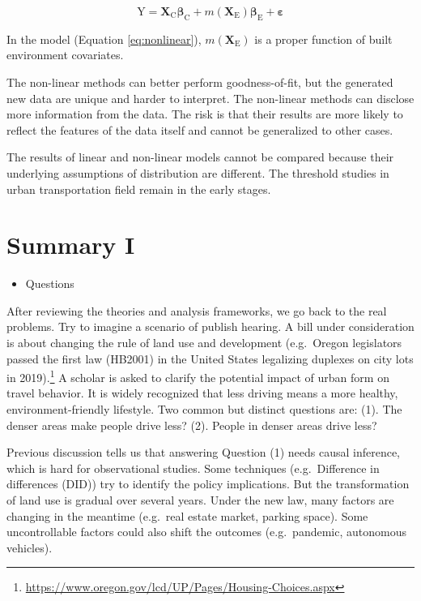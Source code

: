 \documentclass[
  11pt,
  openany]{memoir}
\providecommand{\tightlist}{%
  \setlength{\itemsep}{0pt}\setlength{\parskip}{0pt}}
\begin{document}
\begin{equation}
\label{eq:nonlinear}
\mathrm{Y}=\mathbf{X}_\mathrm{C}\boldsymbol{\beta}_\mathrm{C}+m(\mathbf{X}_\mathrm{E})\boldsymbol{\beta}_\mathrm{E}+\boldsymbol{\varepsilon}
\end{equation}

In the model (Equation \eqref{eq:nonlinear}), \(m(\mathbf{X}_\mathrm{E})\) is a proper function of built environment covariates.

The non-linear methods can better perform goodness-of-fit, but the generated new data are unique and harder to interpret. The non-linear methods can disclose more information from the data. The risk is that their results are more likely to reflect the features of the data itself and cannot be generalized to other cases.

The results of linear and non-linear models cannot be compared because their underlying assumptions of distribution are different. The threshold studies in urban transportation field remain in the early stages.

\hypertarget{summary-i}{%
\chapter{Summary I}\label{summary-i}}

\begin{itemize}
\tightlist
\item
  Questions
\end{itemize}

After reviewing the theories and analysis frameworks, we go back to the real problems.
Try to imagine a scenario of publish hearing. A bill under consideration is about changing the rule of land use and development (e.g.~Oregon legislators passed the first law (HB2001) in the United States legalizing duplexes on city lots in 2019).\footnote{\url{https://www.oregon.gov/lcd/UP/Pages/Housing-Choices.aspx}}
A scholar is asked to clarify the potential impact of urban form on travel behavior.
It is widely recognized that less driving means a more healthy, environment-friendly lifestyle.
Two common but distinct questions are: (1). The denser areas make people drive less? (2). People in denser areas drive less?

Previous discussion tells us that answering Question (1) needs causal inference, which is hard for observational studies.
Some techniques (e.g.~Difference in differences (DID)) try to identify the policy implications.
But the transformation of land use is gradual over several years. Under the new law, many factors are changing in the meantime (e.g.~real estate market, parking space).
Some uncontrollable factors could also shift the outcomes (e.g.~pandemic, autonomous vehicles).
\end{document}
